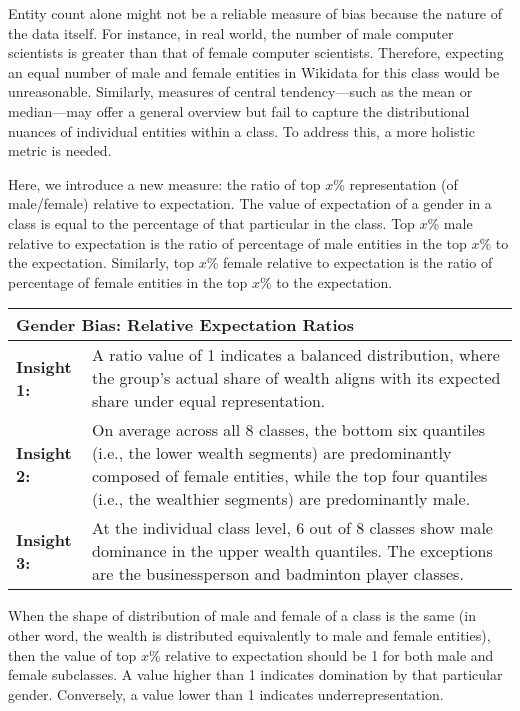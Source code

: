 Entity count alone might not be a reliable measure of bias because the nature of the data itself. For instance, in real world, the number of male computer scientists is greater than that of female computer scientists. Therefore, expecting an equal number of male and female entities in Wikidata for this class would be unreasonable. Similarly, measures of central tendency—such as the mean or median—may offer a general overview but fail to capture the distributional nuances of individual entities within a class. To address this, a more holistic metric is needed.

Here, we introduce a new measure: the ratio of top \(x\)\% representation (of male/female) relative to expectation. The value of expectation of a gender in a class is equal to the percentage of that particular in the class. Top \(x\)\% male relative to expectation is the ratio of percentage of male entities in the top \(x\)\% to the expectation. Similarly, top \(x\)\% female relative to expectation is the ratio of percentage of female entities in the top \(x\)\% to the expectation.

\begin{table}[h]
    \centering
    \renewcommand{\arraystretch}{1.3}
    \begin{tabular}{|l p{12cm}|} 
        \hline
        \multicolumn{2}{|l|}{\textbf{Gender Bias: Relative Expectation Ratios}} \\
        \hline
        \textbf{Insight 1:} & A ratio value of 1 indicates a balanced distribution, where the group's actual share of wealth aligns with its expected share under equal representation. \\
        \textbf{Insight 2:} & On average across all 8 classes, the bottom six quantiles (i.e., the lower wealth segments) are predominantly composed of female entities, while the top four quantiles (i.e., the wealthier segments) are predominantly male. \\
        \textbf{Insight 3:} & At the individual class level, 6 out of 8 classes show male dominance in the upper wealth quantiles. The exceptions are the businessperson and badminton player classes. \\
        \hline
    \end{tabular}
\end{table}

When the shape of distribution of male and female of a class is the same (in other word, the wealth is distributed equivalently to male and female entities), then the value of top \(x\)\% relative to expectation should be 1 for both male and female subclasses. A value higher than 1 indicates domination by that particular gender. Conversely, a value lower than 1 indicates underrepresentation.

